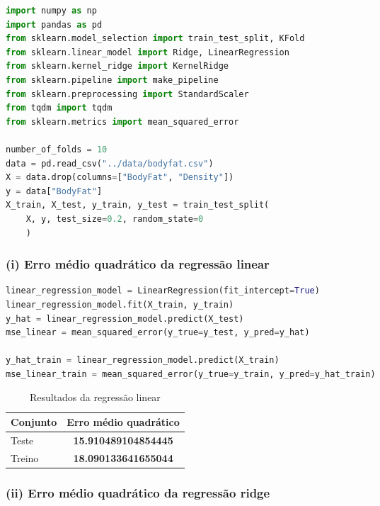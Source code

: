


\begin{lstlisting}[language=Python]
import numpy as np
import pandas as pd
from sklearn.model_selection import train_test_split, KFold
from sklearn.linear_model import Ridge, LinearRegression
from sklearn.kernel_ridge import KernelRidge
from sklearn.pipeline import make_pipeline
from sklearn.preprocessing import StandardScaler
from tqdm import tqdm
from sklearn.metrics import mean_squared_error

number_of_folds = 10
data = pd.read_csv("../data/bodyfat.csv")
X = data.drop(columns=["BodyFat", "Density"])
y = data["BodyFat"]
X_train, X_test, y_train, y_test = train_test_split(
    X, y, test_size=0.2, random_state=0
    )
\end{lstlisting}
\newpage
\subsubsection*{(i) Erro médio quadrático da regressão linear}

\begin{lstlisting}[language=Python]
linear_regression_model = LinearRegression(fit_intercept=True)
linear_regression_model.fit(X_train, y_train)
y_hat = linear_regression_model.predict(X_test)
mse_linear = mean_squared_error(y_true=y_test, y_pred=y_hat)

y_hat_train = linear_regression_model.predict(X_train)
mse_linear_train = mean_squared_error(y_true=y_train, y_pred=y_hat_train)
\end{lstlisting}
\begin{table}[h!]
    \centering
    \begin{tabular}{|l|c|}
        \hline
        Conjunto & Erro médio quadrático       \\ \hline
        Teste    & \textbf{15.910489104854445} \\
        Treino   & \textbf{18.090133641655044} \\
        \hline
    \end{tabular}
    \caption{Resultados da regressão linear}
\end{table}
\newpage
\subsubsection*{(ii) Erro médio quadrático da regressão ridge}

